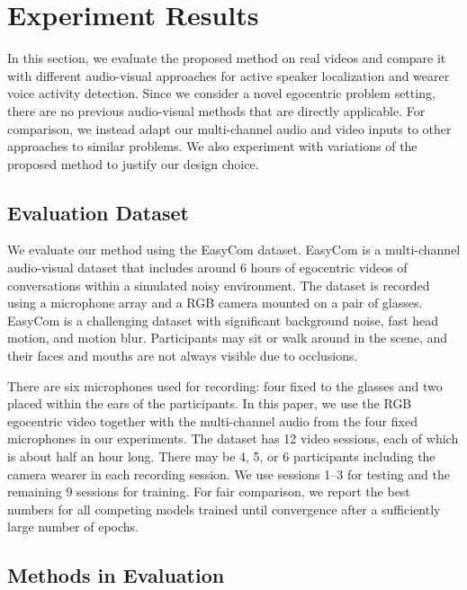 \documentclass[10pt,twocolumn,letterpaper]{article}
\begin{document}
\section{Experiment Results}
\vspace{-5pt}

In this section, we evaluate the proposed method on real videos and compare it with different audio-visual approaches
for active speaker localization and wearer voice activity detection.
Since we consider a novel egocentric problem setting, 
there are no previous audio-visual methods that are directly applicable.
For comparison, we instead adapt our multi-channel audio and video inputs to other
approaches to similar problems.
We also experiment with variations of the proposed method to justify our design choice.

\subsection{Evaluation Dataset}
\vspace{-5pt}

We evaluate our method using the EasyCom \cite{easycom} dataset. EasyCom is a multi-channel audio-visual dataset that includes around 
6 hours of 
egocentric videos of conversations within a simulated noisy environment. The dataset is recorded using a microphone array and a RGB camera mounted on a pair of 
glasses. EasyCom is a challenging dataset with significant background noise, fast head motion, and motion blur. 
Participants may sit or walk around in the scene, and 
their faces and mouths are
not always visible due to occlusions.
 
There are six microphones used for recording: four fixed to the glasses and 
two placed within the ears of the participants.
In this paper, we use the
RGB egocentric video together with the multi-channel audio from the four fixed microphones in our experiments.
The dataset has 12 video sessions, each of which is about half an hour long. There may be 4, 5, or 6 participants 
including the camera wearer in each recording session.
We use sessions 1--3 for testing and the remaining 9 sessions for training.
For fair comparison, we report the best numbers 
for all competing models trained until convergence after a sufficiently large number of epochs.

\subsection{Methods in Evaluation}
\vspace{-5pt}
\end{document}
